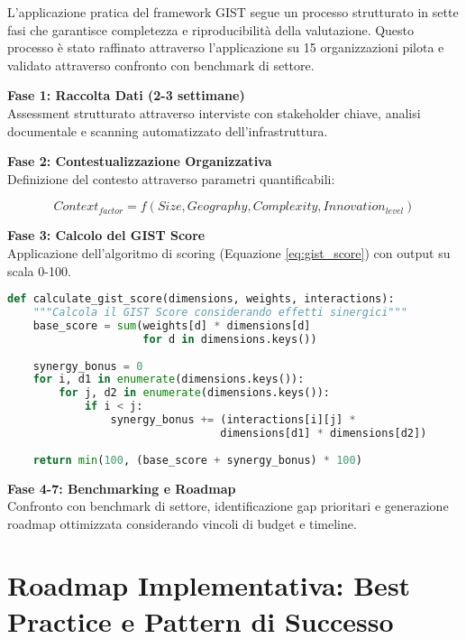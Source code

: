 L'applicazione pratica del framework GIST segue un processo strutturato in sette fasi che garantisce completezza e riproducibilità della valutazione. Questo processo è stato raffinato attraverso l'applicazione su 15 organizzazioni pilota e validato attraverso confronto con benchmark di settore.

\textbf{Fase 1: Raccolta Dati (2-3 settimane)}\\
Assessment strutturato attraverso interviste con stakeholder chiave, analisi documentale e scanning automatizzato dell'infrastruttura.

\textbf{Fase 2: Contestualizzazione Organizzativa}\\
Definizione del contesto attraverso parametri quantificabili:

\begin{equation}
Context_{factor} = f(Size, Geography, Complexity, Innovation_{level})
\label{eq:context_factor}
\end{equation}

\textbf{Fase 3: Calcolo del GIST Score}\\
Applicazione dell'algoritmo di scoring (Equazione \ref{eq:gist_score}) con output su scala 0-100.

\begin{lstlisting}[language=Python, caption=Implementazione del Calcolo GIST Score]
def calculate_gist_score(dimensions, weights, interactions):
    """Calcola il GIST Score considerando effetti sinergici"""
    base_score = sum(weights[d] * dimensions[d] 
                     for d in dimensions.keys())
    
    synergy_bonus = 0
    for i, d1 in enumerate(dimensions.keys()):
        for j, d2 in enumerate(dimensions.keys()):
            if i < j:
                synergy_bonus += (interactions[i][j] * 
                                 dimensions[d1] * dimensions[d2])
    
    return min(100, (base_score + synergy_bonus) * 100)
\end{lstlisting}

\textbf{Fase 4-7: Benchmarking e Roadmap}\\
Confronto con benchmark di settore, identificazione gap prioritari e generazione roadmap ottimizzata considerando vincoli di budget e timeline.

\section{Roadmap Implementativa: Best Practice e Pattern di Successo}


